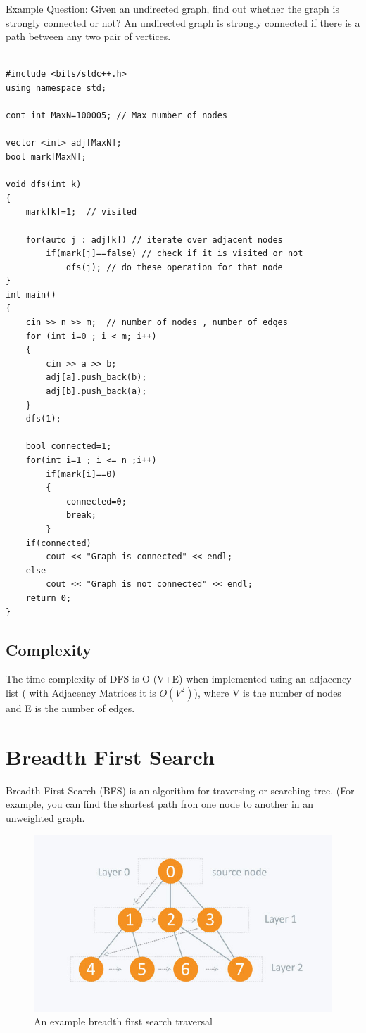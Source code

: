 \documentclass[12pt]{article}
\begin{document}
    
    Example Question: Given an undirected graph, find out whether the graph is strongly connected or not? An undirected graph is strongly connected if there is a path between any two pair of vertices.
    \begin{verbatim}

#include <bits/stdc++.h>
using namespace std;

cont int MaxN=100005; // Max number of nodes

vector <int> adj[MaxN];
bool mark[MaxN];

void dfs(int k)
{
    mark[k]=1;  // visited
    
    for(auto j : adj[k]) // iterate over adjacent nodes 
        if(mark[j]==false) // check if it is visited or not
            dfs(j); // do these operation for that node
}
int main() 
{ 
    cin >> n >> m;  // number of nodes , number of edges
    for (int i=0 ; i < m; i++)
    {
        cin >> a >> b;
        adj[a].push_back(b);
        adj[b].push_back(a);
    }
    dfs(1);

    bool connected=1;
    for(int i=1 ; i <= n ;i++)
        if(mark[i]==0)
        {
            connected=0;
            break;
        }
    if(connected)
        cout << "Graph is connected" << endl;
    else
        cout << "Graph is not connected" << endl;
    return 0; 
} 
\end{verbatim}

\subsection{Complexity}
The time complexity of DFS is O (V+E) when implemented using an adjacency list ( with Adjacency Matrices it is  $O(V^2)$), where V is the number of nodes and E is the number of edges. \cite{2}


\section{Breadth First Search}
    Breadth First Search (BFS) is an algorithm for traversing or searching tree. (For example, you can find the shortest path fron one node to another in an unweighted graph. 
\begin{figure}[h]
    \centering
    \includegraphics[width=\linewidth/2]{fdec3c2.jpg}
    \caption{An example breadth first search traversal}
    \label{fig:my_label}
\end{figure}
\end{document}
